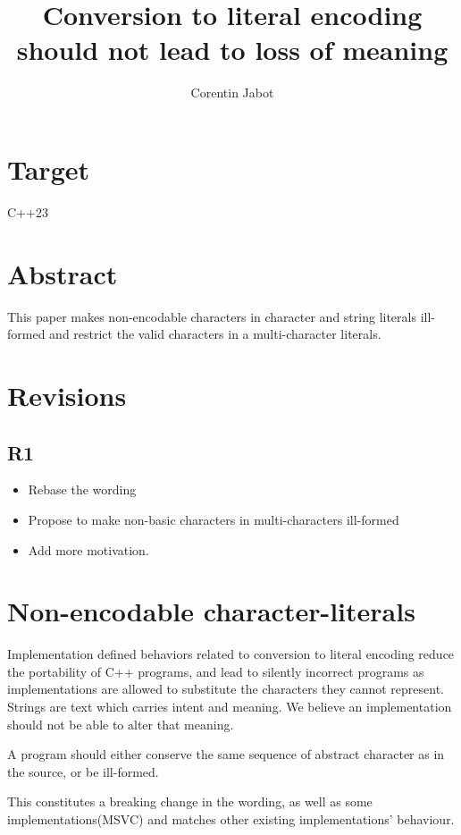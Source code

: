 \documentclass{wg21}
\title{Conversion to literal encoding should not lead to loss of meaning}
\author{Corentin Jabot}{corentin.jabot@gmail.com}
\begin{document}
\maketitle


\section{Target}

C++23

\section{Abstract}

This paper makes non-encodable characters in character and string literals ill-formed and restrict the valid characters in a multi-character 
literals.

\section{Revisions}
\subsection{R1}
\begin{itemize}
    \item Rebase the wording
    \item Propose to make non-basic characters in multi-characters ill-formed
    \item Add more motivation.
\end{itemize}


\section{Non-encodable character-literals}

Implementation defined behaviors related to conversion to literal encoding reduce the portability of C++ programs, and lead to silently incorrect
programs as implementations are allowed to substitute the characters they cannot represent.
Strings are text which carries intent and meaning. We believe an implementation should not be able to alter that meaning.

A program should either conserve the same sequence of abstract character as in the source, or be ill-formed.

This constitutes a breaking change in the wording, as well as some implementations(MSVC) and matches other existing implementations' behaviour.
\end{document}
